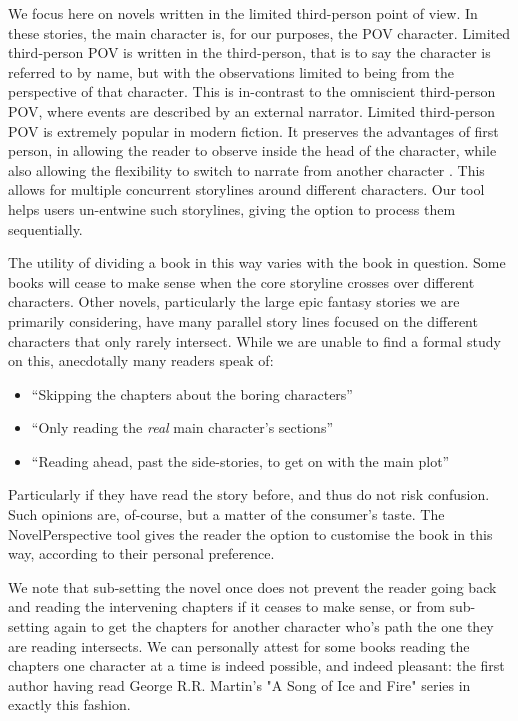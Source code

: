 \documentclass[11pt,a4paper]{article}
\newcommand{\parencite}{\citep}
\begin{document}
We focus here on novels written in the limited third-person point of view.
In these stories, the main character is, for our purposes, the POV character.
Limited third-person POV is written in the third-person, that is to say the character is referred to by name, but with the observations limited to being from the perspective of that character.
This is in-contrast to the omniscient third-person POV, where events are described by an external narrator.
Limited third-person POV is extremely popular in modern fiction.
It preserves the advantages of first person, in allowing the reader to observe inside the head of the character, while also allowing the flexibility to switch to narrate from another character \parencite{booth2010rhetoric}.
This allows for multiple concurrent storylines around different characters.
Our tool helps users un-entwine such storylines, giving the option to process them sequentially.


The utility of dividing a book in this way varies with the book in question.
Some books will cease to make sense when the core storyline crosses over different characters.
Other novels, particularly the large epic fantasy stories we are primarily considering,
have many parallel story lines focused on the different characters that only rarely intersect.
While we are unable to find a formal study on this, 
anecdotally many readers speak of:
\begin{itemize}
	\item ``Skipping the chapters about the boring characters''
	\item ``Only reading the \emph{real} main character's sections''
	\item ``Reading ahead, past the side-stories, to get on with the main plot''	
\end{itemize}
Particularly if they have read the story before, and thus do not risk confusion.
Such opinions are, of-course, but a matter of the consumer's taste.
The NovelPerspective tool gives the reader the option to customise the book in this way, according to their personal preference.

We note that sub-setting the novel once does not prevent the reader going back and reading the intervening chapters if it ceases to make sense, or from sub-setting again to get the chapters for another character who's path the one they are reading intersects.
We can personally attest for some books reading the chapters one character at a time is indeed possible, and indeed pleasant: the first author having read George R.R. Martin's "A Song of Ice and Fire" series in exactly this fashion.
\end{document}
